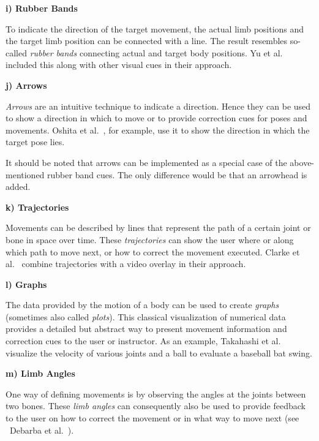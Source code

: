 \textbf{i) Rubber Bands}

To indicate the direction of the target movement, the actual limb positions and the target limb position can be connected with a line. The result resembles so-called \textit{rubber bands} connecting actual and target body positions. Yu et al.~\cite{yu2020pmd} included this along with other visual cues in their approach.

\textbf{j) Arrows}

\textit{Arrows} are an intuitive technique to indicate a direction. Hence they can be used to show a direction in which to move or to provide correction cues for poses and movements. Oshita et al.~\cite{oshita2018sts}, for example, use it to show the direction in which the target pose lies.

It should be noted that arrows can be implemented as a special case of the above-mentioned rubber band cues. The only difference would be that an arrowhead is added.

\textbf{k) Trajectories}

Movements can be described by lines that represent the path of a certain joint or bone in space over time. These \textit{trajectories} can show the user where or along which path to move next, or how to correct the movement executed. Clarke et al.~\cite{clarke2020rva} combine trajectories with a video overlay in their approach.

\textbf{l) Graphs}

The data provided by the motion of a body can be used to create \textit{graphs} (sometimes also called \emph{plots}). This classical visualization of numerical data provides a detailed but abstract way to present movement information and correction cues to the user or instructor. As an example, Takahashi et al.~\cite{takahashi2019vrb} visualize the velocity of various joints and a ball to evaluate a baseball bat swing.

\textbf{m) Limb Angles}

One way of defining movements is by observing the angles at the joints between two bones. These \textit{limb angles} can consequently also be used to provide feedback to the user on how to correct the movement or in what way to move next (see \eg\ Debarba et al.~\cite{debarba2018arv}).





